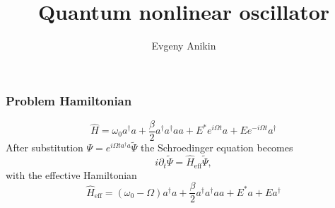 \documentclass{beamer}
\title{Quantum nonlinear oscillator}
\author{Evgeny Anikin}
\institute{Skolkovo institute of science and technology}
\date{}
\begin{document}
\begin{frame}
    \titlepage
\end{frame}

\begin{frame}
    \frametitle{Problem Hamiltonian}
    \begin{equation}
       \hat{H} = \omega_0 a^\dagger a + \frac{\beta}{2} a^\dagger a^\dagger a a + 
                    E^*e^{i\Omega t} a + Ee^{-i\Omega t} a^\dagger 
    \end{equation}
    After substitution $\Psi = e^{i\Omega t a^\dagger a} \widetilde{\Psi}$ the Schroedinger equation 
    becomes
    \begin{equation}
        i\partial_t \widetilde{\Psi} = \hat{H}_{\mathrm{eff}}\widetilde{\Psi},
    \end{equation}
    with the effective Hamiltonian
    \begin{equation}
        \hat{H}_{\mathrm{eff}} = (\omega_0 - \Omega) a^\dagger a + 
                            \frac{\beta}{2} a^\dagger a^\dagger a a + 
                    E^* a + Ea^\dagger 
    \end{equation}
\end{frame}
\end{document}
